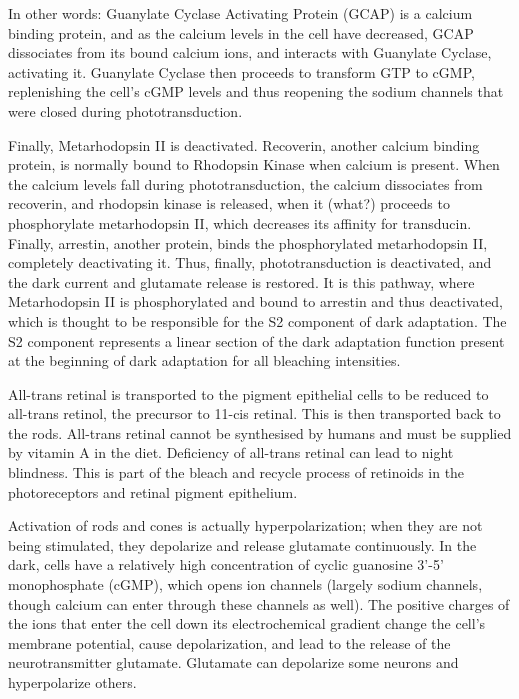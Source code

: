 \documentclass[]{book}
\begin{document}
In other words: Guanylate Cyclase Activating Protein (GCAP) is a calcium binding protein, and as the calcium levels in the cell have decreased, GCAP dissociates from its bound calcium ions, and interacts with Guanylate Cyclase, activating it. Guanylate Cyclase then proceeds to transform GTP to cGMP, replenishing the cell's cGMP levels and thus reopening the sodium channels that were closed during phototransduction.

Finally, Metarhodopsin II is deactivated. Recoverin, another calcium binding protein, is normally bound to Rhodopsin Kinase when calcium is present. When the calcium levels fall during phototransduction, the calcium dissociates from recoverin, and rhodopsin kinase is released, when it (what?) proceeds to phosphorylate metarhodopsin II, which decreases its affinity for transducin. Finally, arrestin, another protein, binds the phosphorylated metarhodopsin II, completely deactivating it. Thus, finally, phototransduction is deactivated, and the dark current and glutamate release is restored. It is this pathway, where Metarhodopsin II is phosphorylated and bound to arrestin and thus deactivated, which is thought to be responsible for the S2 component of dark adaptation. The S2 component represents a linear section of the dark adaptation function present at the beginning of dark adaptation for all bleaching intensities.

All-trans retinal is transported to the pigment epithelial cells to be reduced to all-trans retinol, the precursor to 11-cis retinal. This is then transported back to the rods. All-trans retinal cannot be synthesised by humans and must be supplied by vitamin A in the diet. Deficiency of all-trans retinal can lead to night blindness. This is part of the bleach and recycle process of retinoids in the photoreceptors and retinal pigment epithelium.

Activation of rods and cones is actually hyperpolarization; when they are not being stimulated, they depolarize and release glutamate continuously. In the dark, cells have a relatively high concentration of cyclic guanosine 3'-5' monophosphate (cGMP), which opens ion channels (largely sodium channels, though calcium can enter through these channels as well). The positive charges of the ions that enter the cell down its electrochemical gradient change the cell's membrane potential, cause depolarization, and lead to the release of the neurotransmitter glutamate. Glutamate can depolarize some neurons and hyperpolarize others.
\end{document}
